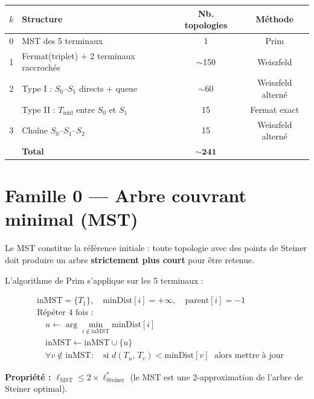 \documentclass[12pt, a4paper]{article}
\newcommand{\dist}[2]{d\!\left(#1,\,#2\right)}
\begin{document}
\begin{center}
\begin{tabular}{clcc}
\toprule
$k$ & \textbf{Structure} & \textbf{Nb. topologies} & \textbf{Méthode} \\
\midrule
0 & MST des 5 terminaux & 1 & Prim \\
1 & Fermat(triplet) + 2 terminaux raccrochés & $\sim$150 & Weiszfeld \\
2 & Type I : $S_0$–$S_1$ directs + queue & $\sim$60 & Weiszfeld alterné \\
  & Type II : $T_\text{mid}$ entre $S_0$ et $S_1$ & 15 & Fermat exact \\
3 & Chaîne $S_0$–$S_1$–$S_2$ & 15 & Weiszfeld alterné \\
\midrule
& \textbf{Total} & $\mathbf{\sim 241}$ & \\
\bottomrule
\end{tabular}
\end{center}

\section{Famille 0 — Arbre couvrant minimal (MST)}

Le MST constitue la référence initiale : toute topologie avec des points de Steiner
doit produire un arbre \textbf{strictement plus court} pour être retenue.

L'algorithme de Prim s'applique sur les 5 terminaux :

\begin{align}
    &\text{inMST} = \{T_1\}, \quad \text{minDist}[i] = +\infty, \quad \text{parent}[i] = -1 \nonumber\\
    &\text{Répéter 4 fois :} \nonumber\\
    &\quad u \leftarrow \arg\min_{i \notin \text{inMST}} \text{minDist}[i] \nonumber\\
    &\quad \text{inMST} \leftarrow \text{inMST} \cup \{u\} \nonumber\\
    &\quad \forall v \notin \text{inMST} : \quad
       \text{si } \dist{T_u}{T_v} < \text{minDist}[v] \;\text{ alors mettre à jour} \nonumber
\end{align}

\textbf{Propriété :} $\ell_\text{MST} \leq 2 \times \ell_\text{Steiner}^*$
(le MST est une 2-approximation de l'arbre de Steiner optimal).
\end{document}

